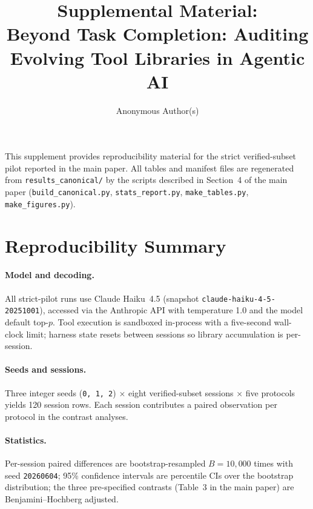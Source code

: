 \documentclass[sigconf,anonymous,review,natbib=false]{acmart}
\begin{document}
\title{Supplemental Material:\\Beyond Task Completion: Auditing Evolving Tool Libraries in Agentic AI}
\author{Anonymous Author(s)}
\maketitle

This supplement provides reproducibility material for the strict
verified-subset pilot reported in the main paper. All tables and
manifest files are regenerated from \texttt{results\_canonical/} by the
scripts described in Section~4 of the main paper
(\texttt{build\_canonical.py}, \texttt{stats\_report.py},
\texttt{make\_tables.py}, \texttt{make\_figures.py}).

\section{Reproducibility Summary}
\label{app:reproducibility}

\paragraph{Model and decoding.}
All strict-pilot runs use Claude Haiku~4.5
(snapshot \texttt{claude-haiku-4-5-20251001}), accessed via the
Anthropic API with temperature 1.0 and the model default top-$p$.
Tool execution is sandboxed in-process with a five-second wall-clock
limit; harness state resets between sessions so library accumulation
is per-session.

\paragraph{Seeds and sessions.}
Three integer seeds (\texttt{0, 1, 2}) $\times$ eight verified-subset
sessions $\times$ five protocols yields 120 session rows. Each session
contributes a paired observation per protocol in the contrast
analyses.

\paragraph{Statistics.}
Per-session paired differences are bootstrap-resampled $B{=}10{,}000$
times with seed \texttt{20260604}; 95\% confidence intervals are
percentile CIs over the bootstrap distribution; the three
pre-specified contrasts (Table~3 in the main paper) are
Benjamini--Hochberg adjusted.
\end{document}
